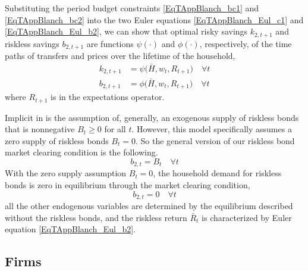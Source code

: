 \documentclass[letterpaper,12pt]{article}
\theoremstyle{definition}
\begin{document}
    Substituting the period budget constraints \eqref{EqTAppBlanch_bc1} and \eqref{EqTAppBlanch_bc2} into the two Euler equations \eqref{EqTAppBlanch_Eul_c1} and \eqref{EqTAppBlanch_Eul_b2}, we can show that optimal risky savings $k_{2,t+1}$ and riskless savings $b_{2,t+1}$ are functions $\psi(\cdot)$ and $\phi(\cdot)$, respectively, of the time paths of transfers and prices over the lifetime of the household,
    \begin{align}
      k_{2,t+1} &= \psi\bigl(\bar{H}, w_t, R_{t+1}\bigr) \quad\forall t \label{EqTAppBlanch_psi} \\
      b_{2,t+1} &= \phi\bigl(\bar{H}, w_t, R_{t+1}\bigr) \quad\forall t \label{EqTAppBlanch_phi}
    \end{align}
    where $R_{t+1}$ is in the expectations operator.

    Implicit in \citet{Blanchard:2019} is the assumption of, generally, an exogenous supply of riskless bonds that is nonnegative $B_t\geq 0$ for all $t$. However, this model specifically assumes a zero supply of riskless bonds $B_t=0$. So the general version of our riskless bond market clearing condition is the following.
    \begin{equation}\label{EqModelMC_B_gen}
      b_{2,t} = B_t \quad\forall t
    \end{equation}
    With the zero supply assumption $B_t = 0$, the household demand for riskless bonds is zero in equilibrium through the market clearing condition,
    \begin{equation}\label{EqModelMC_B_zero}
      b_{2,t} = 0 \quad\forall t
    \end{equation}
    all the other endogenous variables are determined by the equilibrium described without the riskless bonds, and the riskless return $\bar{R}_t$ is characterized by Euler equation \eqref{EqTAppBlanch_Eul_b2}.


  \subsection{Firms}
\end{document}
